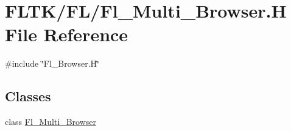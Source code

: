 \hypertarget{_fl___multi___browser_8_h}{}\section{F\+L\+T\+K/\+F\+L/\+Fl\+\_\+\+Multi\+\_\+\+Browser.H File Reference}
\label{_fl___multi___browser_8_h}
{\ttfamily \#include \char`\"{}Fl\+\_\+\+Browser.\+H\char`\"{}}\newline
\subsection*{Classes}
\begin{DoxyCompactItemize}
\item 
class \hyperlink{class_fl___multi___browser}{Fl\+\_\+\+Multi\+\_\+\+Browser}
\end{DoxyCompactItemize}

